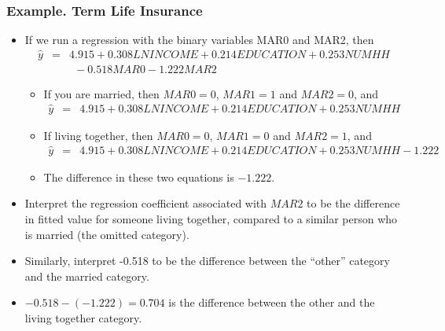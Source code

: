 \begin{frame}[shrink=5]
 \frametitle{Example. Term Life Insurance}
  \begin{itemize}
   \item If we run a regression with the binary variables MAR0 and
   MAR2, then
   \begin{eqnarray*}
\widehat{y} &=& 4.915 + 0.308 LNINCOME +0.214 EDUCATION + 0.253
NUMHH \\
 & & ~~ -0.518 MAR0 -1.222 MAR2
\end{eqnarray*}
\begin{itemize}
\item If you are married, then $MAR0=0$, $MAR1=1$ and $MAR2=0$, and
   \begin{eqnarray*}
\widehat{y} &=& 4.915 + 0.308 LNINCOME +0.214 EDUCATION + 0.253
NUMHH
\end{eqnarray*}
\item If living together, then $MAR0=0$, $MAR1=0$ and $MAR2=1$, and
   \begin{eqnarray*}
\widehat{y} &=& 4.915 + 0.308 LNINCOME +0.214 EDUCATION + 0.253
NUMHH -1.222
\end{eqnarray*}
\item The difference in these two equations is $-1.222.$
\end{itemize}
\item Interpret the regression coefficient associated with
$MAR2$ to be the difference in fitted value for someone living
together, compared to a similar person who is married (the omitted
category).
\item Similarly, interpret -0.518 to be the difference between the
``other'' category and the married category.
\item $-0.518 - (-1.222) =0.704$ is the difference between the
other and the living together category.
     \end{itemize}
\end{frame}




